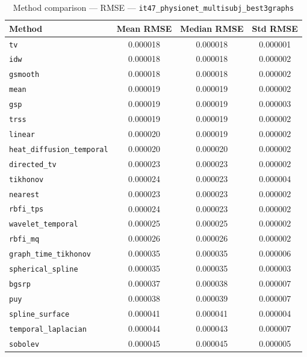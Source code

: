 \begin{table}[ht]
\centering
\caption{Method comparison — RMSE — \texttt{it47_physionet_multisubj_best3graphs}}
\label{tab:rmse_it47_physionet_multisubj_best3graphs}
\begin{tabular}{lccc}
\hline
Method & Mean RMSE & Median RMSE & Std RMSE \\
\hline
\texttt{tv} & 0.000018 & 0.000018 & 0.000001 \\
\texttt{idw} & 0.000018 & 0.000018 & 0.000002 \\
\texttt{gsmooth} & 0.000018 & 0.000018 & 0.000002 \\
\texttt{mean} & 0.000019 & 0.000019 & 0.000002 \\
\texttt{gsp} & 0.000019 & 0.000019 & 0.000003 \\
\texttt{trss} & 0.000019 & 0.000019 & 0.000002 \\
\texttt{linear} & 0.000020 & 0.000019 & 0.000002 \\
\texttt{heat_diffusion_temporal} & 0.000020 & 0.000020 & 0.000002 \\
\texttt{directed_tv} & 0.000023 & 0.000023 & 0.000002 \\
\texttt{tikhonov} & 0.000024 & 0.000023 & 0.000004 \\
\texttt{nearest} & 0.000023 & 0.000023 & 0.000002 \\
\texttt{rbfi_tps} & 0.000024 & 0.000023 & 0.000002 \\
\texttt{wavelet_temporal} & 0.000025 & 0.000025 & 0.000002 \\
\texttt{rbfi_mq} & 0.000026 & 0.000026 & 0.000002 \\
\texttt{graph_time_tikhonov} & 0.000035 & 0.000035 & 0.000006 \\
\texttt{spherical_spline} & 0.000035 & 0.000035 & 0.000003 \\
\texttt{bgsrp} & 0.000037 & 0.000038 & 0.000007 \\
\texttt{puy} & 0.000038 & 0.000039 & 0.000007 \\
\texttt{spline_surface} & 0.000041 & 0.000041 & 0.000004 \\
\texttt{temporal_laplacian} & 0.000044 & 0.000043 & 0.000007 \\
\texttt{sobolev} & 0.000045 & 0.000045 & 0.000005 \\
\hline
\end{tabular}
\end{table}
